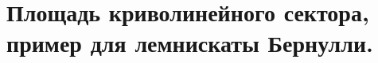 \documentclass[../main.tex]{subfiles}
\begin{document}
\newpage
\section{Площадь криволинейного сектора, пример для лемнискаты Бернулли.}
\end{document}

